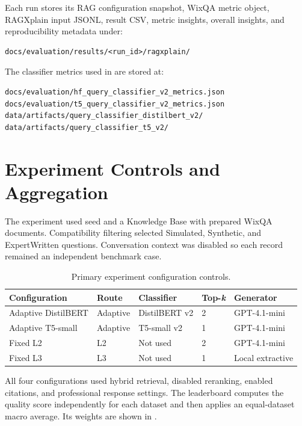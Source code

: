 Each run stores its RAG configuration snapshot, WixQA metric object,
RAGXplain input JSONL, result CSV, metric insights, overall insights, and
reproducibility metadata under:

\begin{lstlisting}[language={}]
docs/evaluation/results/<run_id>/ragxplain/
\end{lstlisting}

The classifier metrics used in  are stored at:

\begin{lstlisting}[language={}]
docs/evaluation/hf_query_classifier_v2_metrics.json
docs/evaluation/t5_query_classifier_v2_metrics.json
data/artifacts/query_classifier_distilbert_v2/
data/artifacts/query_classifier_t5_v2/
\end{lstlisting}

\section{Experiment Controls and Aggregation}

The experiment used seed \PrimaryExperimentSeed{} and a Knowledge Base with
\PrimaryExperimentKBDocuments{} prepared WixQA documents. Compatibility
filtering selected \PrimarySimulatedCases{} Simulated,
\PrimarySyntheticCases{} Synthetic, and \PrimaryExpertCases{} ExpertWritten
questions. Conversation context was disabled so each record remained an
independent benchmark case.

\begin{table}[H]
  \centering
  \caption{Primary experiment configuration controls.}
  \label{tab:appendix-config-controls}
  \small
  \begin{tabularx}{\textwidth}{p{}p{}p{}p{}X}
    \toprule
    Configuration & Route & Classifier & Top-\textit{k} & Generator\\
    \midrule
    Adaptive DistilBERT & Adaptive & DistilBERT v2 & 2 & GPT-4.1-mini\\
    Adaptive T5-small & Adaptive & T5-small v2 & 1 & GPT-4.1-mini\\
    Fixed L2 & L2 & Not used & 2 & GPT-4.1-mini\\
    Fixed L3 & L3 & Not used & 1 & Local extractive\\
    \bottomrule
  \end{tabularx}
\end{table}

All four configurations used hybrid retrieval, disabled reranking, enabled
citations, and professional response settings. The leaderboard computes the
quality score independently for each dataset and then applies an equal-dataset
macro average. Its weights are shown in .

